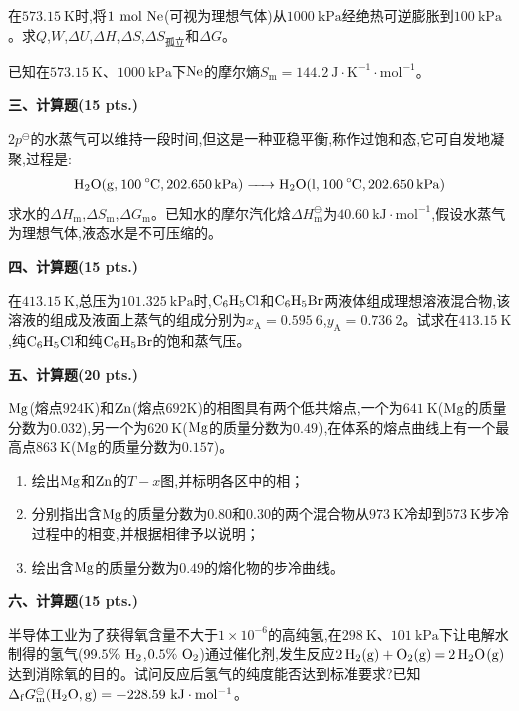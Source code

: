 在$573.15\ \mathrm{K}$时,将$1\ \mathrm{mol}\ \ce{Ne}$(可视为理想气体)从$1000\ \mathrm{kPa}$经绝热可逆膨胀到$100\ \mathrm{kPa}$。求$Q$,$W$,$\Delta U$,$\Delta H$,$\Delta S$,$\Delta S_\text{孤立}$和$\Delta G$。

已知在$573.15\ \mathrm{K}$、$1000\ \mathrm{kPa}$下$\ce{Ne}$的摩尔熵$S_\mathrm{m}=144.2\ \mathrm{J\cdot K^{-1}\cdot mol^{-1}}$。

\vspace{0.5cm}
\noindent\textbf{三、计算题(15 pts.)}

$2p^\ominus$的水蒸气可以维持一段时间,但这是一种亚稳平衡,称作过饱和态,它可自发地凝聚,过程是:
\[
\ce{H2O(g, 100^\circ C, 202.650 kPa) -> H2O(l, 100^\circ C, 202.650 kPa)}
\]
求水的$\Delta H_\mathrm{m}$,$\Delta S_\mathrm{m}$,$\Delta G_\mathrm{m}$。已知水的摩尔汽化焓$\Delta H_\mathrm{m}^\ominus$为$40.60\ \mathrm{kJ\cdot mol^{-1}}$,假设水蒸气为理想气体,液态水是不可压缩的。

\vspace{0.5cm}
\noindent\textbf{四、计算题(15 pts.)}

在$413.15\ \mathrm{K}$,总压为$101.325\ \mathrm{kPa}$时,$\ce{C6H5Cl}$和$\ce{C6H5Br}$两液体组成理想溶液混合物,该溶液的组成及液面上蒸气的组成分别为$x_\mathrm{A}=0.595\ 6$,$y_\mathrm{A}=0.736\ 2$。试求在$413.15\ \mathrm{K}$,纯$\ce{C6H5Cl}$和纯$\ce{C6H5Br}$的饱和蒸气压。

\vspace{0.5cm}
\noindent\textbf{五、计算题(20 pts.)}

$\ce{Mg}$(熔点$924\mathrm{K}$)和$\ce{Zn}$(熔点$692\mathrm{K}$)的相图具有两个低共熔点,一个为$641\ \mathrm{K}$($\ce{Mg}$的质量分数为$0.032$),另一个为$620\ \mathrm{K}$($\ce{Mg}$的质量分数为$0.49$),在体系的熔点曲线上有一个最高点$863\ \mathrm{K}$($\ce{Mg}$的质量分数为$0.157$)。
\begin{enumerate}[label=(\arabic*), itemsep=1ex]
    \item 绘出$\ce{Mg}$和$\ce{Zn}$的$T-x$图,并标明各区中的相；
    \item 分别指出含$\ce{Mg}$的质量分数为$0.80$和$0.30$的两个混合物从$973\ \mathrm{K}$冷却到$573\ \mathrm{K}$步冷过程中的相变,并根据相律予以说明；
    \item 绘出含$\ce{Mg}$的质量分数为$0.49$的熔化物的步冷曲线。
\end{enumerate}

\vspace{0.5cm}
\noindent\textbf{六、计算题(15 pts.)}

半导体工业为了获得氧含量不大于$1\times10^{-6}$的高纯氢,在$298\ \mathrm{K}$、$101\ \mathrm{kPa}$下让电解水制得的氢气($99.5\%\ \ce{H2}$,$0.5\%\ \ce{O2}$)通过催化剂,发生反应$\ce{2H2(g) + O2(g) = 2H2O(g)}$达到消除氧的目的。试问反应后氢气的纯度能否达到标准要求?已知$\Delta_\mathrm{f}G_\mathrm{m}^\ominus(\ce{H2O,g})=-228.59\ \mathrm{kJ\cdot mol^{-1}}$。

